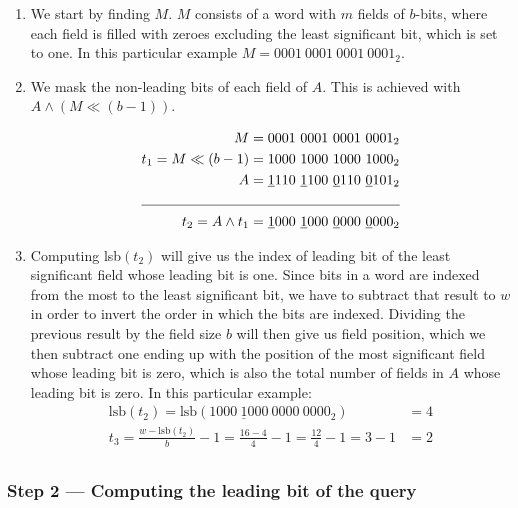 \begin{enumerate}
    \item
    We start by finding $M$. $M$ consists of a word with $m$ fields of $b$-bits, where each field is filled with zeroes excluding the least significant bit, which is set to one. In this particular example $M = 0001\ 0001\ 0001\ 0001_2$.
    
    \item %
    We mask the non-leading bits of each field of $A$. This is achieved with $A \wedge (M \ll (b - 1))$.
    
    \begin{align*}
        M &= 0001\ 0001\ 0001\ 0001_2 \\
        t_1 = M \ll (b - 1) &= 1000\ 1000\ 1000\ 1000_2 \\
        A &= \underline{1}110\ \underline{1}100\ \underline{0}110\ \underline{0}101_2 \\
        \cline{1-2}
        t_2 = A \wedge t_1 &= \underline{1}000\ \underline{1}000\ \underline{0}000\ \underline{0}000_2
    \end{align*}
    
    \item
    Computing lsb$(t_2)$ will give us the index of leading bit of the least significant field whose leading bit is one. Since bits in a word are indexed from the most to the least significant bit, we have to subtract that result to $w$ in order to invert the order in which the bits are indexed. Dividing the previous result by the field size $b$ will then give us field position, which we then subtract one ending up with the position of the most significant field whose leading bit is zero, which is also the total number of fields in $A$ whose leading bit is zero. In this particular example:
    \begin{align*}
        \text{lsb}(t_2) = \text{lsb}(1000\ \underline{1}000\ 0000\ 0000_2) &= 4 \\
        t_3 = \frac{w - \text{lsb}(t_2)}{b} - 1 = \frac{16 - 4}{4} - 1  = \frac{12}{4} - 1 = 3 - 1 &= 2 \\
    \end{align*}
\end{enumerate}

\subsubsection{Step 2 --- Computing the leading bit of the query}

